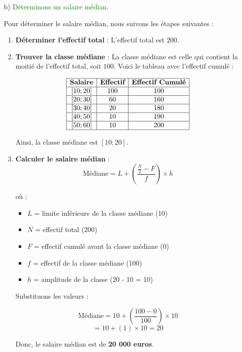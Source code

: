 \documentclass[12pt]{article}
\begin{document}
\begin{enumerate}

  \item[b)] \textcolor{green}{Déterminons un salaire médian.}

  Pour déterminer le salaire médian, nous suivons les étapes suivantes :

  \begin{enumerate}
    \item \textbf{Déterminer l'effectif total} : 
    L'effectif total est \(200\).

    \item \textbf{Trouver la classe médiane} :
    La classe médiane est celle qui contient la moitié de l'effectif total, soit \(100\). Voici le tableau avec l'effectif cumulé :

    \[
    \begin{array}{|c|c|c|}
    \hline
    \textbf{Salaire} & \textbf{Effectif} & \textbf{Effectif Cumulé} \\
    \hline
    [10;20] & 100 & 100 \\
    \hline
    [20;30] & 60 & 160 \\
    \hline
    [30;40] & 20 & 180 \\
    \hline
    [40;50] & 10 & 190 \\
    \hline
    [50;60] & 10 & 200 \\
    \hline
    \end{array}
    \]

    Ainsi, la classe médiane est \([10;20]\).

    \item \textbf{Calculer le salaire médian} :
    \[
    \text{Médiane} = L + \left( \frac{\frac{N}{2} - F}{f} \right) \times h
    \]

    où :
    \begin{itemize}
      \item \(L\) = limite inférieure de la classe médiane (10)
      \item \(N\) = effectif total (200)
      \item \(F\) = effectif cumulé avant la classe médiane (0)
      \item \(f\) = effectif de la classe médiane (100)
      \item \(h\) = amplitude de la classe (20 - 10 = 10)
    \end{itemize}

    Substituons les valeurs :

    \[
    \text{Médiane} = 10 + \left( \frac{100 - 0}{100} \right) \times 10
    \]
    \[
    = 10 + (1) \times 10 = 20
    \]

    Donc, le salaire médian est de \textbf{20 000 euros}.
  \end{enumerate}
\end{enumerate}
\end{document}
